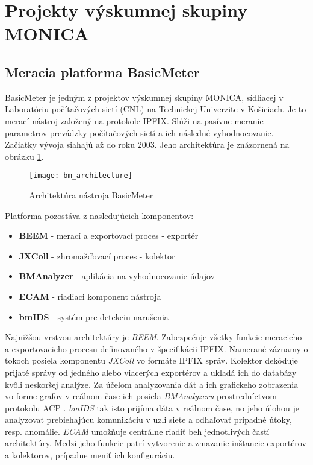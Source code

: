 \section{Projekty v\'yskumnej skupiny MONICA}

\subsection{Meracia platforma BasicMeter}

BasicMeter \citep{monica} je jedným z projektov výskumnej 
skupiny MONICA, sídliacej v Laboratóriu počítačových sietí (CNL) na Technickej Univerzite v Košiciach. 
Je to merací nástroj založený na protokole IPFIX. Slúži na pasívne meranie parametrov prevádzky 
počítačových sietí a ich následné vyhodnocovanie. Začiatky vývoja siahajú až do roku 2003. Jeho 
architektúra je znázornená na obrázku \ref{o:bm_architecture}.

\begin{figure}[ht!]
\centering
\texttt{[image: bm\_architecture]}
\caption{Architektúra nástroja BasicMeter \citep{ja}}\label{o:bm_architecture}
\end{figure}

Platforma pozostáva z nasledujúcich komponentov:
\begin{itemize}
 \item \textbf{BEEM} - merací a exportovací proces - exportér
 \item \textbf{JXColl} - zhromažďovací proces - kolektor
 \item \textbf{BMAnalyzer} - aplikácia na vyhodnocovanie údajov
 \item \textbf{ECAM} - riadiaci komponent nástroja
 \item \textbf{bmIDS} - systém pre detekciu narušenia
\end{itemize}

Najnižšou vrstvou architektúry je \emph{BEEM}. Zabezpečuje všetky funkcie 
meracieho a exportovacieho procesu definovaného v špecifikácii IPFIX. Namerané záznamy o tokoch
posiela komponentu \emph{JXColl} vo formáte IPFIX správ. Kolektor dekóduje prijaté správy od jedného
alebo viacerých exportérov a ukladá ich do databázy kvôli neskoršej analýze. Za účelom analyzovania dát
a ich grafickeho zobrazenia vo forme grafov v reálnom čase ich posiela \emph{BMAnalyzeru} prostredníctvom 
protokolu ACP \citep{ado}. \emph{bmIDS} tak isto prijíma dáta v reálnom čase, no jeho úlohou je analyzovať
prebiehajúcu komunikáciu v uzli siete a odhaľovať pripadné útoky, resp. anomálie. \emph{ECAM} umožňuje 
centrálne riadiť beh jednotlivých častí architektúry. Medzi jeho funkcie patrí vytvorenie a zmazanie 
inštancie exportérov a kolektorov, prípadne meniť ich konfiguráciu. \citep{ja, veri}

